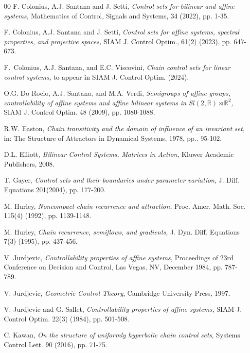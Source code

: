 \documentclass[preprint,12pt]{elsarticle}
\begin{document}
\begin{thebibliography}{00}
 F. Colonius, A.J. Santana and J. Setti,
 \textit{Control sets for bilinear and affine systems,} Mathematics of Control,
Signals and Systems, 34 (2022), pp. 1-35.

 F. Colonius, A.J. Santana and J. Setti,
 \textit{Control sets for affine systems, spectral properties, and projective
spaces,} SIAM J. Control Optim., 61(2) (2023), pp. 647-673.

 F.~Colonius, A.J. Santana, and E.C. Viscovini,
 \textit{ Chain control sets for linear control systems,} to appear in SIAM J.
Control Optim. (2024).

 O.G. Do Rocio, A.J. Santana, and M.A. Verdi,
 \textit{Semigroups of affine groups, controllability of affine systems and
affine bilinear systems in }$Sl(2,\mathbb{R})\rtimes\mathbb{R}^{2}$\emph{,
}SIAM J. Control Optim. 48 (2009), pp. 1080-1088.

 R.W. Easton,  \textit{Chain transitivity and the domain
of influence of an invariant set}, in: The Structure of Attractors in
Dynamical Systems, 1978, pp.. 95-102.

 D.L. Elliott,  \textit{Bilinear Control Systems,
Matrices in Action}, Kluwer Academic Publishers, 2008.

 T. Gayer,  \textit{Control sets and their boundaries
under parameter variation}, J. Diff. Equations 201(2004), pp. 177-200.

 M. Hurley,  \textit{Noncompact chain recurrence and
attraction,} Proc. Amer. Math. Soc. 115(4) (1992), pp. 1139-1148.

 M. Hurley,  \textit{Chain recurrence, semiflows, and
gradients, }J. Dyn. Diff. Equations 7(3) (1995), pp. 437-456.

 V. Jurdjevic,  \textit{Controllability properties of
affine systems}, Proceedings of 23rd Conference on Decision and Control, Las
Vegas, NV, December 1984, pp. 787-789.

 V. Jurdjevic,  \textit{Geometric Control Theory},
Cambridge University Press, 1997.

 V. Jurdjevic and G. Sallet,  \textit{Controllability
properties of affine systems,} SIAM J. Control Optim. 22(3) (1984), pp. 501-508.

 C. Kawan,  \textit{On the structure of uniformly
hyperbolic chain control sets, }Systems Control Lett. 90 (2016), pp. 71-75.


\end{thebibliography}
\end{document}
